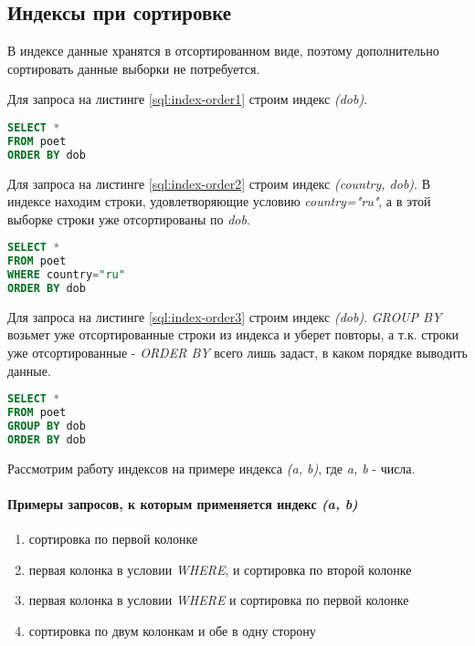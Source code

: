 \subsection{Индексы при сортировке}

В индексе данные хранятся в отсортированном виде, поэтому дополнительно сортировать данные выборки не потребуется.

Для запроса на листинге \ref{sql:index-order1} строим индекс \textit{(dob)}.

\begin{lstlisting}[language=sql, label=sql:index-order1, caption={запрос для index-order}]
SELECT * 
FROM poet
ORDER BY dob
\end{lstlisting}

Для запроса на листинге \ref{sql:index-order2} строим индекс \textit{(country, dob)}. В индексе находим строки, удовлетворяющие условию \textit{country="ru"}, а в этой выборке строки уже отсортированы по \textit{dob}.

\begin{lstlisting}[language=sql, label=sql:index-order2, caption={запрос для index-order}]
SELECT * 
FROM poet
WHERE country="ru" 
ORDER BY dob
\end{lstlisting}

Для запроса на листинге \ref{sql:index-order3} строим индекс \textit{(dob)}. \textit{GROUP BY} возьмет уже отсортированные строки из индекса и уберет повторы, а т.к. строки уже отсортированные - \textit{ORDER BY} всего лишь задаст, в каком порядке выводить данные. 

\begin{lstlisting}[language=sql, label=sql:index-order3, caption={запрос для index-order}]
SELECT *
FROM poet
GROUP BY dob
ORDER BY dob
\end{lstlisting}


Рассмотрим работу индексов на примере индекса \textit{(a, b)}, где \textit{a, b} - числа.

\paragraph{Примеры запросов, к которым применяется индекс \textit{(a, b)}}

\begin{enumerate}
\item сортировка по первой колонке
\item первая колонка в условии \textit{WHERE}, и сортировка по второй колонке
\item первая колонка в условии \textit{WHERE} и сортировка по первой колонке
\item сортировка по двум колонкам и обе в одну сторону
\end{enumerate}

